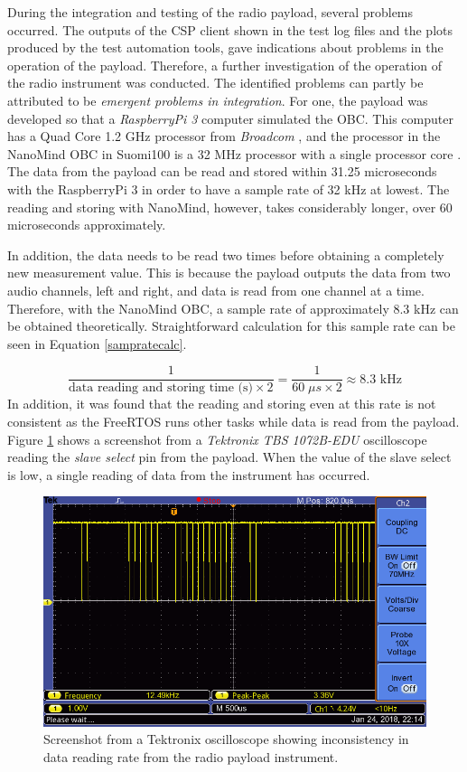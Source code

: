 \documentclass[english,12pt,a4paper,pdftex,elec,utf8]{aaltothesis}
\begin{document}
During the integration and testing of the radio payload, several problems occurred. The outputs of the CSP client shown in the test log files and the plots produced by the test automation tools, gave indications about problems in the operation of the payload. Therefore, a further investigation of the operation of the radio instrument was conducted. The identified problems can partly be attributed to be \textit{emergent problems in integration}. For one, the payload was developed so that a \textit{RaspberryPi 3} computer simulated the OBC. This computer has a Quad Core 1.2 GHz processor from \textit{Broadcom} \cite{raspi3}, and the processor in the NanoMind OBC in Suomi100 is a 32 MHz processor with a single processor core \cite{nanomindds}. The data from the payload can be read and stored within 31.25 microseconds with the RaspberryPi 3 in order to have a sample rate of 32 kHz at lowest. The reading and storing with NanoMind, however, takes considerably longer, over 60 microseconds approximately. \par
In addition, the data needs to be read two times before obtaining a completely new measurement value. This is because the payload outputs the data from two audio channels, left and right, and data is read from one channel at a time. Therefore, with the NanoMind OBC, a sample rate of approximately 8.3 kHz can be obtained theoretically. Straightforward calculation for this sample rate can be seen in Equation \ref{sampratecalc}. \par
\begin{equation}
\frac{1}{\textrm{data reading and storing time (s)}\times2} = \frac{1}{60\; \mu s\times2} \approx 8.3 \textrm{ kHz}
\label{sampratecalc}
\end{equation}
In addition, it was found that the reading and storing even at this rate is not consistent as the FreeRTOS runs other tasks while data is read from the payload. Figure \ref{payloadosc1} shows a screenshot from a \textit{Tektronix TBS 1072B-EDU} oscilloscope reading the \textit{slave select} pin from the payload. When the value of the slave select is low, a single reading of data from the instrument has occurred.
\begin{figure}[h!]
\centering
\includegraphics[scale=0.5]{F0001TEK}
\caption{Screenshot from a Tektronix oscilloscope showing inconsistency in data reading rate from the radio payload instrument.}
\label{payloadosc1}
\end{figure}
\end{document}
